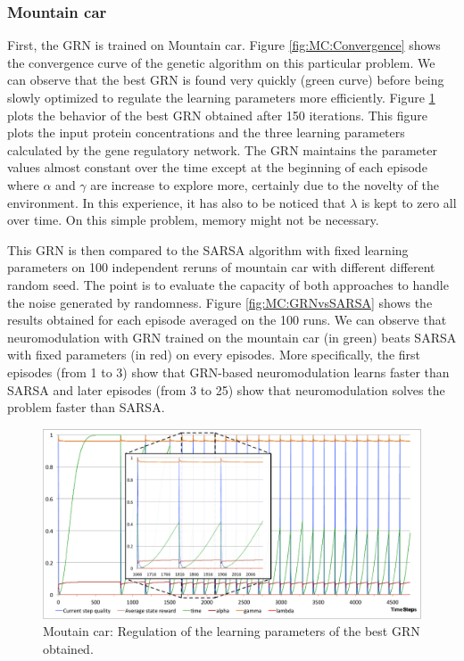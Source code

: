 \subsubsection{Mountain car}
First, the GRN is trained on Mountain car. Figure \ref{fig:MC:Convergence} shows the convergence curve of the genetic algorithm on this particular problem. We can observe that the best GRN is found very quickly (green curve) before being slowly optimized to regulate the learning parameters more efficiently. Figure \ref{fig:MC:GRNBehavior} plots the behavior of the best GRN obtained after 150 iterations. This figure plots the input protein concentrations and the three learning parameters calculated by the gene regulatory network. The GRN maintains the parameter values almost constant over the time except at the beginning of each episode where $\alpha$ and $\gamma$ are increase to explore more, certainly due to the novelty of the environment. In this experience, it has also to be noticed that $\lambda$ is kept to zero all over time. On this simple problem, memory might not be necessary. 

This GRN is then compared to the SARSA algorithm with fixed learning parameters on 100 independent reruns of mountain car with different different random seed. The point is to evaluate the capacity of both approaches to handle the noise generated by randomness. Figure \ref{fig:MC:GRNvsSARSA} shows the results obtained for each episode averaged on the 100 runs. We can observe that neuromodulation with GRN trained on the mountain car (in green) beats SARSA with fixed parameters (in red) on every episodes. More specifically, the first episodes (from 1 to 3) show that GRN-based neuromodulation learns faster than SARSA and later episodes (from 3 to 25) show that neuromodulation solves the problem faster than SARSA.

\begin{figure}[h]
\center
\includegraphics[width=\linewidth]{MC_GRNBehavior.pdf}
\caption{Moutain car: Regulation of the learning parameters of the best GRN obtained.}\label{fig:MC:GRNBehavior}
\end{figure}

